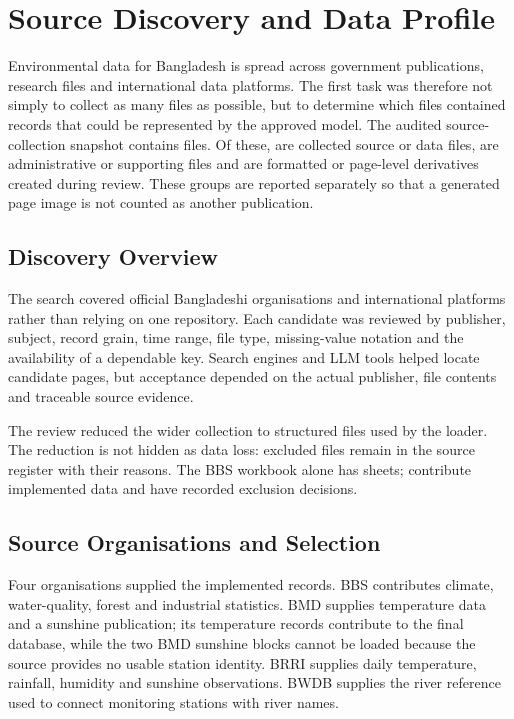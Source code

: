 \section{Source Discovery and Data Profile}
\label{sec:data}

Environmental data for Bangladesh is spread across government publications,
research files and international data platforms. The first task was therefore
not simply to collect as many files as possible, but to determine which files
contained records that could be represented by the approved model. The audited
source-collection snapshot contains \mAllDriveFiles{} files. Of these,
\mSourceDataFiles{} are collected source or data files, \mSupportFiles{} are
administrative or supporting files and \mDerivedArtifacts{} are formatted or
page-level derivatives created during review. These groups are reported
separately so that a generated page image is not counted as another publication.

\subsection{Discovery Overview}
\label{subsec:source-discovery}

The search covered official Bangladeshi organisations and international
platforms rather than relying on one repository. Each candidate was reviewed by
publisher, subject, record grain, time range, file type, missing-value notation
and the availability of a dependable key. Search engines and LLM tools helped
locate candidate pages, but acceptance depended on the actual publisher, file
contents and traceable source evidence.

The review reduced the wider collection to \mSourceFiles{} structured files
used by the loader. The reduction is not hidden as data loss: excluded files
remain in the source register with their reasons. The BBS workbook alone has
\mSheetsTotal{} sheets; \mSheetsUsed{} contribute implemented data and
\mSheetsExcluded{} have recorded exclusion decisions.

\subsection{Source Organisations and Selection}
\label{subsec:source-organisations}

Four organisations supplied the implemented records. BBS contributes climate,
water-quality, forest and industrial statistics. BMD supplies temperature data
and a sunshine publication; its temperature records contribute to the final
database, while the two BMD sunshine blocks cannot be loaded because the source
provides no usable station identity. BRRI supplies daily temperature,
rainfall, humidity and sunshine observations. BWDB supplies the river reference
used to connect monitoring stations with river names.

